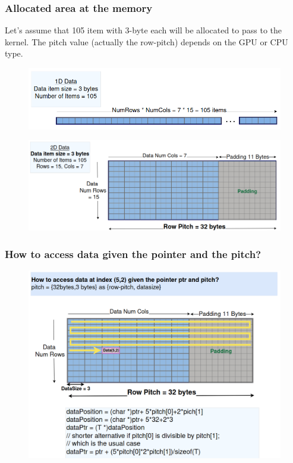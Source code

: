 \documentclass[9pt]{beamer}
\begin{document}
\begin{frame}[fragile]
\frametitle{Allocated area at the memory}
\hspace{-0.4\baselineskip}
\small
Let's assume that 105 item with 3-byte each will be allocated to pass to the kernel. The pitch value (actually the row-pitch) depends on the GPU or CPU type.

\begin{figure}
\hspace{-1.2\baselineskip}
   \centering
   \includegraphics[width=0.75\linewidth]{Screenshot from 2024-10-01 17-31-32.png}
   \label{fig:enter-label}
\end{figure}
\hspace{0.1\baselineskip}
\begin{figure}
\hspace{-1.2\baselineskip}
   \centering
   \includegraphics[width=0.75\linewidth]{Screenshot from 2024-10-01 17-30-50.png}
   \label{fig:enter-label}
\end{figure}
\end{frame}



\begin{frame}[fragile]
\frametitle{How to access data given the pointer and the pitch?}
\begin{figure}
    \centering
    \includegraphics[width=0.80\linewidth]{Screenshot from 2024-10-02 15-47-27.png}
\end{figure}

\end{frame}
\end{document}
